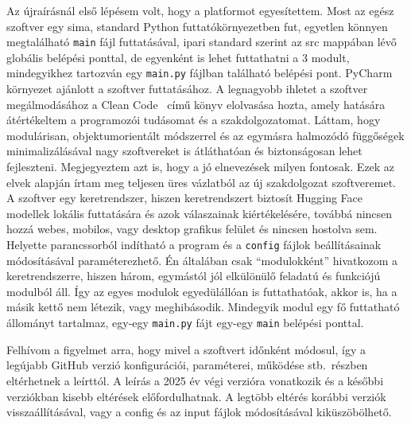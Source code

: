 \documentclass[12pt]{report}
\begin{document}
    Az újraírásnál első lépésem volt, hogy a platformot egyesítettem.
    Most az egész szoftver egy sima, standard Python futtatókörnyezetben fut, egyetlen könnyen megtalálható \texttt{\allowbreak main} fájl futtatásával, ipari standard szerint az src mappában lévő globális belépési ponttal, de egyenként is lehet futtathatni a 3 modult, mindegyikhez tartozván egy \texttt{\allowbreak main.py} fájlban található belépési pont.
    PyCharm környezet ajánlott a szoftver futtatásához.
    A legnagyobb ihletet a szoftver megálmodásához a Clean Code~\cite{martin2008cleancode} című könyv elolvasása hozta, amely hatására átértékeltem a programozói tudásomat és a szakdolgozatomat.
    Láttam, hogy modulárisan, objektumorientált módszerrel és az egymásra halmozódó függőségek minimalizálásával nagy szoftvereket is átláthatóan és biztonságosan lehet fejleszteni.
    Megjegyeztem azt is, hogy a jó elnevezések milyen fontosak.
    Ezek az elvek alapján írtam meg teljesen üres vázlatból az új szakdolgozat szoftveremet.
    A szoftver egy keretrendszer, hiszen keretrendszert biztosít Hugging Face modellek lokális futtatására és azok válaszainak kiértékelésére, továbbá nincsen hozzá webes, mobilos, vagy desktop grafikus felület és nincsen hostolva sem.
    Helyette parancssorból indítható a program és a \texttt{\allowbreak config} fájlok beállításainak módosításával paraméterezhető.
    Én általában csak ``modulokként'' hivatkozom a keretrendszerre, hiszen három, egymástól jól elkülönülő feladatú és funkciójú modulból áll.
    Így az egyes modulok egyedülállóan is futtathatóak, akkor is, ha a másik kettő nem létezik, vagy meghibásodik.
    Mindegyik modul egy fő futtatható állományt tartalmaz, egy-egy \texttt{\allowbreak main.py} fájt egy-egy \texttt{\allowbreak main} belépési ponttal.


    Felhívom a figyelmet arra, hogy mivel a szoftvert időnként módosul, így a legújabb GitHub verzió konfigurációi, paraméterei, működése stb.\ részben eltérhetnek a leírttól.
    A leírás a 2025 év végi verzióra vonatkozik és a későbbi verziókban kisebb eltérések előfordulhatnak.
    A legtöbb eltérés korábbi verziók visszaállításával, vagy a config és az input fájlok módosításával kiküszöbölhető.
\end{document}
